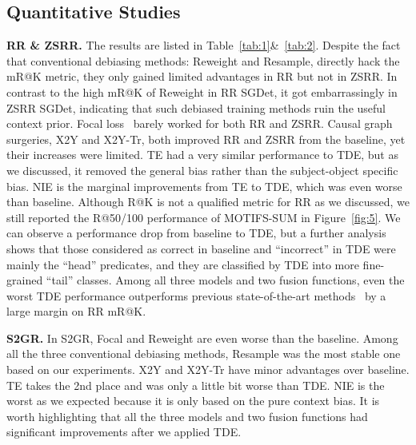 \documentclass[10pt,twocolumn,letterpaper]{article}
\begin{document}
\vspace{-0.05in}
\subsection{Quantitative Studies}
\vspace{-0.05in}
\noindent\textbf{RR \& ZSRR.} The results are listed in Table~\ref{tab:1}\&~\ref{tab:2}. Despite the fact that conventional debiasing methods: Reweight and Resample, directly hack the mR@K metric, they only gained limited advantages in RR but not in ZSRR. In contrast to the high mR@K of Reweight in RR SGDet, it got embarrassingly  in ZSRR SGDet, indicating that such debiased training methods ruin the useful context prior. Focal loss~\cite{lin2017focal} barely worked for both RR and ZSRR. Causal graph surgeries, X2Y and X2Y-Tr, both improved RR and ZSRR from the baseline, yet their increases were limited. TE had a very similar performance to TDE, but as we discussed, it removed the general bias rather than the subject-object specific bias. NIE is the marginal improvements from TE to TDE, which was even worse than baseline. Although R@K is not a qualified metric for RR as we discussed, we still reported the R@50/100 performance of MOTIFS\textsuperscript{}-SUM in Figure~\ref{fig:5}. We can observe a performance drop from baseline to TDE, but a further analysis shows that those considered as correct in baseline and ``incorrect'' in TDE were mainly the ``head'' predicates, and they are classified by TDE into more fine-grained ``tail'' classes. Among all three models and two fusion functions, even the worst TDE performance outperforms previous state-of-the-art methods~\cite{tang2019learning, chen2019knowledge} by a large margin on RR mR@K.

\noindent\textbf{S2GR.} In S2GR, Focal and Reweight are even worse than the baseline. Among all the three conventional debiasing methods, Resample was the most stable one based on our experiments. X2Y and X2Y-Tr have minor advantages over baseline. TE takes the 2nd place and was only a little bit worse than TDE. NIE is the worst as we expected because it is only based on the pure context bias. It is worth highlighting that all the three models and two fusion functions had significant improvements after we applied TDE.
\end{document}
